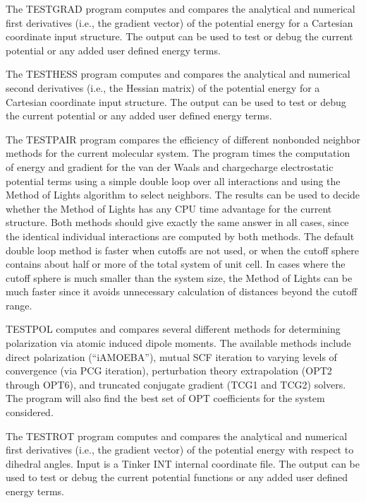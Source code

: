 \documentclass[letterpaper,11pt,english]{sphinxmanual}
\begin{document}

The TESTGRAD program computes and compares the analytical and numerical first derivatives (i.e., the gradient vector) of the potential energy for a Cartesian coordinate input structure. The output can be used to test or debug the current potential or any added user defined energy terms.


The TESTHESS program computes and compares the analytical and numerical second derivatives (i.e., the Hessian matrix) of the potential energy for a Cartesian coordinate input structure. The output can be used to test or debug the current potential or any added user defined energy terms.


The TESTPAIR program compares the efficiency of different nonbonded neighbor methods for the current molecular system. The program times the computation of energy and gradient for the van der Waals and charge\sphinxhyphen{}charge electrostatic potential terms using a simple double loop over all interactions and using the Method of Lights algorithm to select neighbors. The results can be used to decide whether the Method of Lights has any CPU time advantage for the current structure. Both methods should give exactly the same answer in all cases, since the identical individual interactions are computed by both methods. The default double loop method is faster when cutoffs are not used, or when the cutoff sphere contains about half or more of the total system of unit cell. In cases where the cutoff sphere is much smaller than the system size, the Method of Lights can be much faster since it avoids unnecessary calculation of distances beyond the cutoff range.


TESTPOL computes and compares several different methods for determining polarization via atomic induced dipole moments. The available methods include direct polarization (“iAMOEBA”), mutual SCF iteration to varying levels of convergence (via PCG iteration), perturbation theory extrapolation (OPT2 through OPT6), and truncated conjugate gradient (TCG1 and TCG2) solvers. The program will also find the best set of OPT coefficients for the system considered.


The TESTROT program computes and compares the analytical and numerical first derivatives (i.e., the gradient vector) of the potential energy with respect to dihedral angles. Input is a Tinker INT internal coordinate file. The output can be used to test or debug the current potential functions or any added user defined energy terms.
\end{document}
